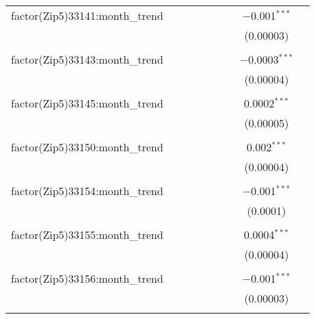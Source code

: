 \begin{table}[H]
{\begin{tabular}{@{\extracolsep{5pt}}lcccccccc}
  factor(Zip5)33141:month\_trend &  &  &  &  &  &  & $-$0.001$^{***}$ &  \\  

   &  &  &  &  &  &  & (0.00003) &  \\  

   & & & & & & & & \\  

  factor(Zip5)33143:month\_trend &  &  &  &  &  &  & $-$0.0003$^{***}$ &  \\  

   &  &  &  &  &  &  & (0.00004) &  \\  

   & & & & & & & & \\  

  factor(Zip5)33145:month\_trend &  &  &  &  &  &  & 0.0002$^{***}$ &  \\  

   &  &  &  &  &  &  & (0.00005) &  \\  

   & & & & & & & & \\  

  factor(Zip5)33150:month\_trend &  &  &  &  &  &  & 0.002$^{***}$ &  \\  

   &  &  &  &  &  &  & (0.00004) &  \\  

   & & & & & & & & \\  

  factor(Zip5)33154:month\_trend &  &  &  &  &  &  & $-$0.001$^{***}$ &  \\  

   &  &  &  &  &  &  & (0.0001) &  \\  

   & & & & & & & & \\  

  factor(Zip5)33155:month\_trend &  &  &  &  &  &  & 0.0004$^{***}$ &  \\  

   &  &  &  &  &  &  & (0.00004) &  \\  

   & & & & & & & & \\  

  factor(Zip5)33156:month\_trend &  &  &  &  &  &  & $-$0.001$^{***}$ &  \\  

   &  &  &  &  &  &  & (0.00003) &  \\  

   & & & & & & & & \\  


\end{tabular}}
\end{table}
